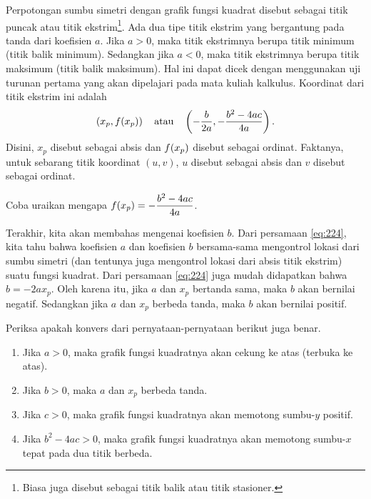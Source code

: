 	\par Perpotongan sumbu simetri dengan grafik fungsi kuadrat disebut sebagai titik puncak atau titik ekstrim\footnote{Biasa juga disebut sebagai titik balik atau titik stasioner.}. Ada dua tipe titik ekstrim yang bergantung pada tanda dari koefisien $ a $. Jika $ a > 0 $, maka titik ekstrimnya berupa titik minimum (titik balik minimum). Sedangkan jika $ a < 0 $, maka titik ekstrimnya berupa titik maksimum (titik balik maksimum). Hal ini dapat dicek dengan menggunakan uji turunan pertama yang akan dipelajari pada mata kuliah kalkulus. Koordinat dari titik ekstrim ini adalah
	\[ \left(x_{p}, \mathop{}\!{f}{\left({x_{p}}\right)}\right) \quad \mbox{atau} \quad \left(-\frac{b}{2a}, -\frac{b^{2} - 4ac}{4a}\right). \]
	Disini, $ x_{p} $ disebut sebagai absis dan $ \mathop{}\!{f}{\left({x_{p}}\right)} $ disebut sebagai ordinat. Faktanya, untuk sebarang titik koordinat $ \left(u, v\right) $, $ u $ disebut sebagai absis dan $ v $ disebut sebagai ordinat.
	
	\begin{explbox}
		Coba uraikan mengapa $ \mathop{}\!{f}{\left({x_{p}}\right)} = -\dfrac{b^{2} - 4ac}{4a} $.
	\end{explbox}
	
	\par Terakhir, kita akan membahas mengenai koefisien $ b $. Dari persamaan \ref{eq:224}, kita tahu bahwa koefisien $ a $ dan koefisien $ b $ bersama-sama mengontrol lokasi dari sumbu simetri (dan tentunya juga mengontrol lokasi dari absis titik ekstrim) suatu fungsi kuadrat. Dari persamaan \ref{eq:224} juga mudah didapatkan bahwa $ b = -2ax_{p} $. Oleh karena itu, jika $ a $ dan $ x_{p} $ bertanda sama, maka $ b $ akan bernilai negatif. Sedangkan jika $ a $ dan $ x_{p} $ berbeda tanda, maka $ b $ akan bernilai positif.
	
	\begin{explbox}
		Periksa apakah konvers dari pernyataan-pernyataan berikut juga benar.
		\begin{enumerate}[leftmargin=*]
			\item Jika $ a > 0 $, maka grafik fungsi kuadratnya akan cekung ke atas (terbuka ke atas).
			\item Jika $ b > 0 $, maka $ a $ dan $ x_{p} $ berbeda tanda.
			\item Jika $ c > 0 $, maka grafik fungsi kuadratnya akan memotong sumbu-$ y $ positif.
			\item Jika $ b^{2} - 4ac > 0 $, maka grafik fungsi kuadratnya akan memotong sumbu-$ x $ tepat pada dua titik berbeda.
		\end{enumerate}
	\end{explbox}
	
